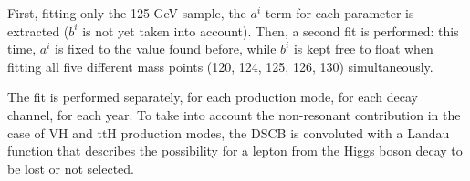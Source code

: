 First, fitting only the 125 GeV sample, the $a^i$ term for each parameter is extracted
($b^i$ is not yet taken into account).
Then, a second fit is performed:
this time, $a^i$ is fixed to the value found before, while $b^i$ is kept free to float when fitting all five different mass points (120, 124, 125, 126, 130\GeV) simultaneously.

The fit is performed separately, for each production mode, for each decay channel, for each year. 
To take into account the non-resonant contribution in the case of VH and ttH production modes, the 
DSCB is convoluted with a Landau function that describes the possibility for a 
lepton from the Higgs boson decay to be lost or not selected.\\
